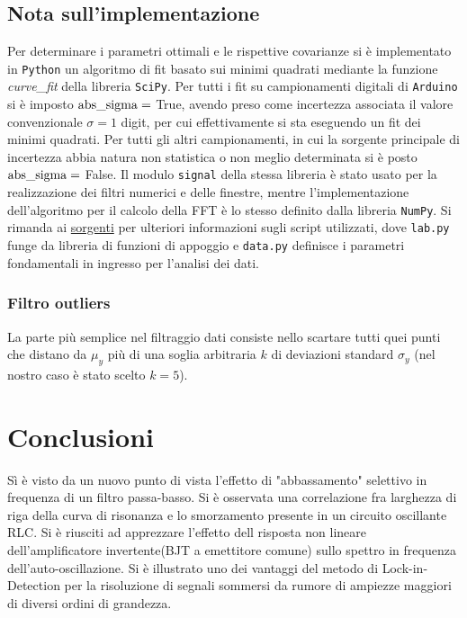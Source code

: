 \documentclass{article}[a4paper, oneside, 11pt]
\begin{document}
\subsection{Nota sull'implementazione}
Per determinare i parametri ottimali e le rispettive covarianze si \`e
implementato in \verb+Python+ un algoritmo di fit basato sui minimi quadrati
mediante la funzione \emph{curve\_fit} della libreria 
\texttt{SciPy}\cite{scipy}.
Per tutti i fit su campionamenti digitali di \verb+Arduino+ si \`e imposto
$\rm{abs\_sigma} =$ True, avendo preso come incertezza associata il valore
convenzionale $\sigma = 1$ digit, per cui effettivamente si sta eseguendo
un fit dei minimi quadrati. Per tutti gli altri campionamenti, in cui la
sorgente principale di incertezza abbia natura non statistica o non meglio
determinata si è posto $\rm{abs\_sigma} =$ False. 
Il modulo \texttt{signal} della stessa libreria è stato usato per
la realizzazione dei filtri numerici e delle finestre, mentre
l'implementazione dell'algoritmo per il calcolo della FFT è lo stesso
definito dalla libreria \texttt{NumPy}\cite{numpy}.
Si rimanda ai
\href{https://github.com/BernardoTomelleri/FFT/tree/master}{sorgenti}
per ulteriori informazioni sugli script utilizzati, dove \verb+lab.py+ funge
da libreria di funzioni di appoggio e \verb+data.py+ definisce i parametri
fondamentali in ingresso per l'analisi dei dati.
\subsubsection{Filtro outliers}
La parte pi\`u semplice nel filtraggio dati consiste nello scartare tutti quei
punti che distano da $\mu_y$ pi\`u di una soglia arbitraria $k$ di deviazioni
standard $\sigma_y$ (nel nostro caso \`e stato scelto $k = 5$).

\section{Conclusioni}
Sì è visto da un nuovo punto di vista l'effetto di "abbassamento" selettivo
in frequenza di un filtro passa-basso.
Si è osservata una correlazione fra larghezza di riga della curva di risonanza
e lo smorzamento presente in un circuito oscillante RLC.
Si è riusciti ad apprezzare l'effetto dell risposta non lineare
dell'amplificatore invertente(BJT a emettitore comune) sullo spettro
in frequenza dell'auto-oscillazione.
Si è illustrato uno dei vantaggi del metodo di Lock-in-Detection per 
la risoluzione di segnali sommersi da rumore di ampiezze maggiori di diversi
ordini di grandezza.

\medskip


\end{document}
